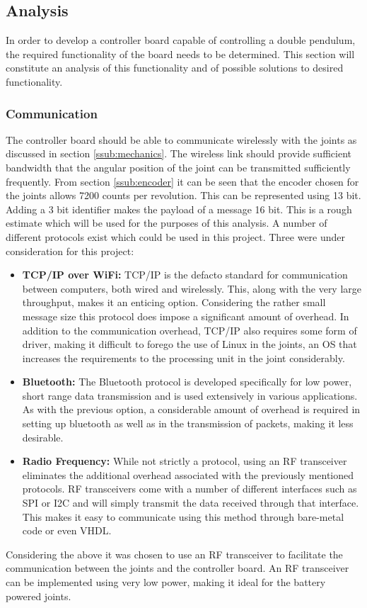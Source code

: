 \subsection{Analysis}
\label{sub:controller_board_analysis}

In order to develop a controller board capable of controlling a double pendulum, the required functionality of the board needs to be determined. 
This section will constitute an analysis of this functionality and of possible solutions to desired functionality.

\subsubsection{Communication} %
\label{ssub:communication}
The controller board should be able to communicate wirelessly with the joints as discussed in section \ref{ssub:mechanics}.
The wireless link should provide sufficient bandwidth that the angular position of the joint can be transmitted sufficiently frequently.
From section \ref{ssub:encoder} it can be seen that the encoder chosen for the joints allows 7200 counts per revolution.
This can be represented using 13 bit. 
Adding a 3 bit identifier makes the payload of a message 16 bit.
This is a rough estimate which will be used for the purposes of this analysis.
A number of different protocols exist which could be used in this project.
Three were under consideration for this project:
\begin{itemize}
	\item \textbf{TCP/IP over WiFi:} TCP/IP is the defacto standard for communication between computers, both wired and wirelessly.
	This, along with the very large throughput, makes it an enticing option.
	Considering the rather small message size this protocol does impose a significant amount of overhead.
	In addition to the communication overhead, TCP/IP also requires some form of driver, making it difficult to forego the use of Linux in the joints, an OS that increases the requirements to the processing unit in the joint considerably.
	\item \textbf{Bluetooth:} The Bluetooth protocol is developed specifically for low power, short range data transmission and is used extensively in various applications.
	As with the previous option, a considerable amount of overhead is required in setting up bluetooth as well as in the transmission of packets, making it less desirable.
	\item \textbf{Radio Frequency:} While not strictly a protocol, using an RF transceiver eliminates the additional overhead associated with the previously mentioned protocols.
	RF transceivers come with a number of different interfaces such as SPI or I2C and will simply transmit the data received through that interface.
	This makes it easy to communicate using this method through bare-metal code or even VHDL.
\end{itemize}
Considering the above it was chosen to use an RF transceiver to facilitate the communication between the joints and the controller board.
An RF transceiver can be implemented using very low power, making it ideal for the battery powered joints.

